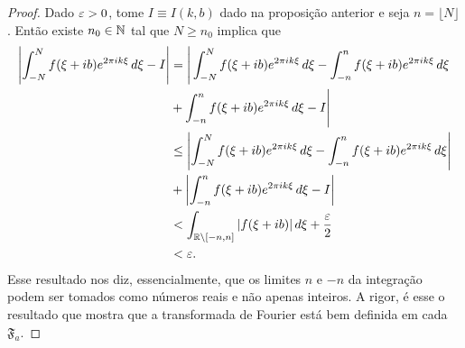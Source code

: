         \begin{proof}
            Dado $\varepsilon>0$, tome $I\equiv I(k,b)$ dado na proposição anterior e seja $n = \lfloor N \rfloor$. 
            Então existe $n_0\in\mathbb{N}$ tal que $N\geq n_0$ implica que
            \begin{align*}
                \left| \int_{-N}^N f(\xi + ib)e^{2\pi ik\xi} \, d\xi - I \right| 
                &= \Bigg| \int_{-N}^N f(\xi + ib)e^{2\pi ik\xi} \, d\xi 
                - \int_{-n}^n f(\xi + ib)e^{2\pi ik\xi} \, d\xi \\
                &+ \int_{-n}^n f(\xi + ib)e^{2\pi ik\xi} \, d\xi - I \Bigg| \\
                &\leq \left| \int_{-N}^N f(\xi + ib)e^{2\pi ik\xi} \, d\xi 
                - \int_{-n}^n f(\xi + ib)e^{2\pi ik\xi} \, d\xi \right| \\
                &+ \left| \int_{-n}^n f(\xi + ib)e^{2\pi ik\xi} \, d\xi - I \right| \\
                &< \int_{\mathbb{R}\setminus[-n,n]} |f(\xi + ib)| \, d\xi + \frac{\varepsilon}{2} \\
                &< \varepsilon.
            \end{align*}
            Esse resultado nos diz, essencialmente, que os limites $n$ e $-n$ da integração podem
            ser tomados como números reais e não apenas inteiros. A rigor, é esse o resultado que mostra
            que a transformada de Fourier está bem definida em cada $\mathfrak{F}_a$.
        \end{proof}
